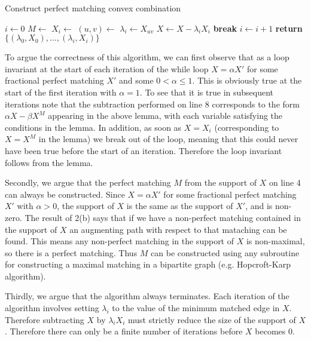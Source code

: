 \documentclass{hmcpset}
\begin{document}
\begin{solution}
\begin{enumerate}
\begin{algorithm}
  \caption{Construct perfect matching convex combination}
  \begin{algorithmic}[1]
    \State $i\gets 0$
    \State $M\gets$ 
    \State $X_i\gets$ 
      \State $(u, v)\gets$ 
      \State $\lambda_i\gets X_{uv}$
      \State $X\gets X - \lambda_i X_i$
        \State \textbf{break}
      \EndIf
      \State $i\gets i + 1$
    \EndWhile
    \State \textbf{return} $\{(\lambda_0, X_0),\ldots,(\lambda_i, X_i)\}$
    \EndProcedure
  \end{algorithmic}
\end{algorithm}

To argue the correctness of this algorithm, we can first observe that as a loop
invariant at the start of each iteration of the while loop $X = \alpha X'$ for
some fractional perfect matching $X'$ and some $0 < \alpha \leq 1$. This
is obviously true at the start of the first iteration with $\alpha = 1$. To
see that it is true in subsequent iterations note that the subtraction performed
on line 8 corresponds to the form $\alpha X - \beta X^M$ appearing in the above
lemma, with each variable satisfying the conditions in the lemma. In addition, as soon
as $X = X_i$ (corresponding to $X = X^M$ in the lemma) we break out
of the loop, meaning that this could never have been true before the start
of an iteration. Therefore the loop invariant follows from the lemma.

Secondly, we argue that the perfect matching $M$ from the support of $X$
on line 4 can always be constructed. Since $X = \alpha X'$
for some fractional perfect matching $X'$ with $\alpha > 0$, the support
of $X$ is the same as the support of $X'$, and is non-zero.
The result of 2(b) says that if we have a non-perfect
matching contained in the support of $X$ an augmenting path with respect to
that mataching can be found. This means any non-perfect matching in the support
of $X$ is non-maximal, so there is a perfect matching. Thus $M$ can be constructed
using any subroutine for constructing a maximal matching in a bipartite graph
(e.g. Hopcroft-Karp algorithm).

Thirdly, we argue that the algorithm always terminates. Each iteration of the
algorithm involves setting $\lambda_i$ to the value of the minimum matched
edge in $X$. Therefore subtracting $X$ by $\lambda_i X_i$ must strictly reduce
the size of the support of $X$. Therefore there can only be a finite number
of iterations before $X$ becomes 0.


\end{enumerate}
\end{solution}
\end{document}
